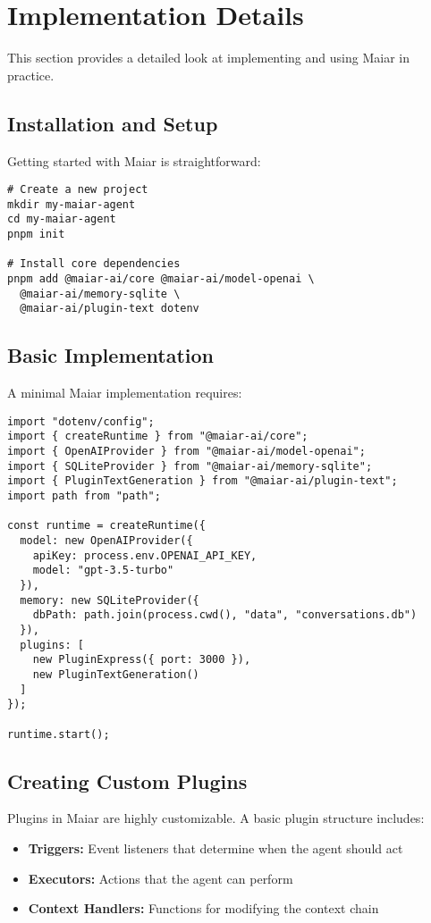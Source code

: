 \documentclass[12pt]{article}
\begin{document}
\section{Implementation Details}
This section provides a detailed look at implementing and using Maiar in practice.

\subsection{Installation and Setup}
Getting started with Maiar is straightforward:

\begin{verbatim}
# Create a new project
mkdir my-maiar-agent
cd my-maiar-agent
pnpm init

# Install core dependencies
pnpm add @maiar-ai/core @maiar-ai/model-openai \
  @maiar-ai/memory-sqlite \
  @maiar-ai/plugin-text dotenv
\end{verbatim}

\subsection{Basic Implementation}
A minimal Maiar implementation requires:

\begin{verbatim}
import "dotenv/config";
import { createRuntime } from "@maiar-ai/core";
import { OpenAIProvider } from "@maiar-ai/model-openai";
import { SQLiteProvider } from "@maiar-ai/memory-sqlite";
import { PluginTextGeneration } from "@maiar-ai/plugin-text";
import path from "path";

const runtime = createRuntime({
  model: new OpenAIProvider({
    apiKey: process.env.OPENAI_API_KEY,
    model: "gpt-3.5-turbo"
  }),
  memory: new SQLiteProvider({
    dbPath: path.join(process.cwd(), "data", "conversations.db")
  }),
  plugins: [
    new PluginExpress({ port: 3000 }),
    new PluginTextGeneration()
  ]
});

runtime.start();
\end{verbatim}

\subsection{Creating Custom Plugins}
Plugins in Maiar are highly customizable. A basic plugin structure includes:

\begin{itemize}
    \item \textbf{Triggers:} Event listeners that determine when the agent should act
    \item \textbf{Executors:} Actions that the agent can perform
    \item \textbf{Context Handlers:} Functions for modifying the context chain
\end{itemize}
\end{document}
